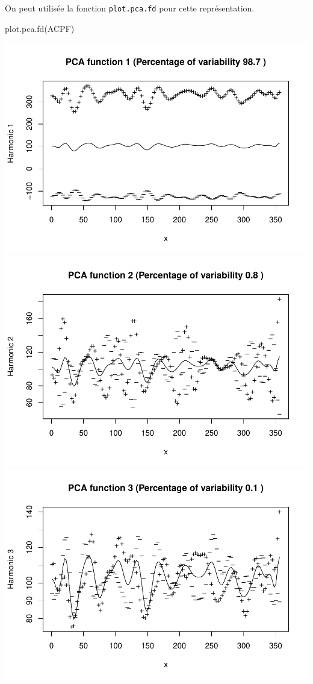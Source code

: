 \documentclass[
]{article}
\newenvironment{Shaded}{\begin{snugshade}}{\end{snugshade}}
\newcommand{\FunctionTok}[1]{\textcolor[rgb]{0.00,0.00,0.00}{#1}}
\newcommand{\NormalTok}[1]{#1}
\begin{document}
On peut utilisée la fonction \texttt{plot.pca.fd} pour cette
représentation.

\begin{Shaded}
\begin{Highlighting}[]
\FunctionTok{plot.pca.fd}\NormalTok{(ACPF)}
\end{Highlighting}
\end{Shaded}

\includegraphics{Projet_CHESNAIS_GUIBERT_files/figure-latex/unnamed-chunk-46-1.pdf}
\includegraphics{Projet_CHESNAIS_GUIBERT_files/figure-latex/unnamed-chunk-46-2.pdf}
\includegraphics{Projet_CHESNAIS_GUIBERT_files/figure-latex/unnamed-chunk-46-3.pdf}
\end{document}
